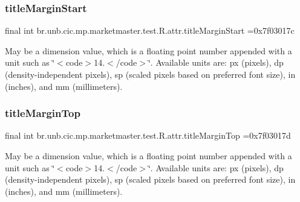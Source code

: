 \subsubsection{\texorpdfstring{title\+Margin\+Start}{titleMarginStart}}
{\footnotesize\ttfamily final int br.\+unb.\+cic.\+mp.\+marketmaster.\+test.\+R.\+attr.\+title\+Margin\+Start =0x7f03017c\hspace{0.3cm}{\ttfamily [static]}}

May be a dimension value, which is a floating point number appended with a unit such as \char`\"{}$<$code$>$14.\+5sp$<$/code$>$\char`\"{}. Available units are\+: px (pixels), dp (density-\/independent pixels), sp (scaled pixels based on preferred font size), in (inches), and mm (millimeters). \mbox{\label{classbr_1_1unb_1_1cic_1_1mp_1_1marketmaster_1_1test_1_1R_1_1attr_a10fa5664685145028f5b870ba95f61fa}} 
\subsubsection{\texorpdfstring{title\+Margin\+Top}{titleMarginTop}}
{\footnotesize\ttfamily final int br.\+unb.\+cic.\+mp.\+marketmaster.\+test.\+R.\+attr.\+title\+Margin\+Top =0x7f03017d\hspace{0.3cm}{\ttfamily [static]}}

May be a dimension value, which is a floating point number appended with a unit such as \char`\"{}$<$code$>$14.\+5sp$<$/code$>$\char`\"{}. Available units are\+: px (pixels), dp (density-\/independent pixels), sp (scaled pixels based on preferred font size), in (inches), and mm (millimeters). \mbox{\label{classbr_1_1unb_1_1cic_1_1mp_1_1marketmaster_1_1test_1_1R_1_1attr_aa60bb1ed0a4da2ddf4767b3addf5298e}} 
